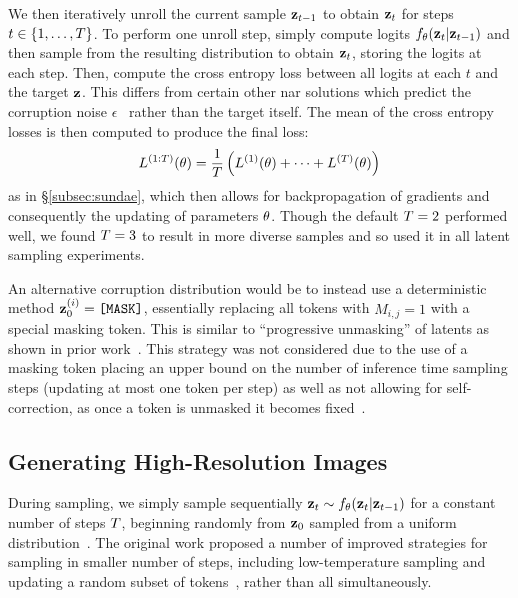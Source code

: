 We then iteratively unroll the current sample $\mathbf{z}_{t-1}$ to obtain
$\mathbf{z}_t$ for steps $t\in \{1, \dots, T\}$. To perform one unroll
step, simply compute logits $f_\theta(\mathbf{z}_t \vert \mathbf{z}_{t-1})$ and then
sample from the resulting distribution to obtain $\mathbf{z}_t$, storing the logits
at each step. Then, compute the cross entropy loss between all logits at each
$t$ and the target $\mathbf{z}$. This differs from certain other \gls{nar} solutions
which predict the corruption noise $\epsilon$~\cite{ho2020ddpm} rather than the
target itself. The mean of the cross entropy losses is then computed to produce
the final loss: 
\begin{equation} 
    L^{(1:T)}(\theta) = \frac{1}{T} \left(L^{(1)}(\theta) +
    \dots + L^{(T)}(\theta) \right) 
\end{equation} 
as in \S\ref{subsec:sundae}, which then allows for backpropagation of gradients
and consequently the updating of parameters $\theta$. Though the
default $T = 2$ performed well, we found $T = 3$ to result
in more diverse samples and so used it in all latent sampling experiments.

An alternative corruption distribution would be to instead use a deterministic
method $\mathbf{z}_0^{(i)}=\texttt{[MASK]}$, essentially replacing all tokens with
$M_{i,j} = 1$ with a special masking token. This is similar to ``progressive
unmasking'' of latents as shown in prior
work~\cite{bondtaylor2021unleashing,austin2021structured}. This strategy was not
considered due to the use of a masking token placing an upper bound on the
number of inference time sampling steps (updating at most one token per step) as
well as not allowing for self-correction, as once a token is unmasked it becomes
fixed~\cite{bondtaylor2021unleashing,austin2021structured}. 

\subsection{Generating High-Resolution Images}
\label{subsec:sundaeSampling}

During sampling, we simply sample sequentially $\mathbf{z}_t \sim f_\theta(\mathbf{z}_t
\vert \mathbf{z}_{t-1})$ for a constant number of steps $T$, beginning
randomly from $\mathbf{z}_0$ sampled from a uniform
distribution~\cite{savinov2022stepunrolled}. The original work proposed a number
of improved strategies for sampling in smaller number of steps, including
low-temperature sampling and updating a random subset of
tokens~\cite{savinov2022stepunrolled}, rather than all simultaneously.

